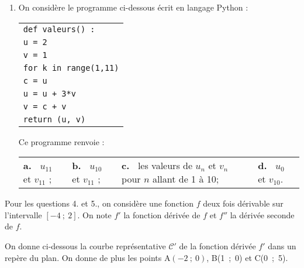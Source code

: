 \documentclass[10pt,a4paper]{article}
\begin{document}
\begin{enumerate}
\item On considère le programme ci-dessous écrit en langage Python :

\begin{center}
\begin{tabular}{|>{\texttt}l|}\hline
\texttt{def valeurs() :}\\
\quad \texttt{u = 2}\\
\quad \texttt{v = 1}\\
\quad \texttt{for k in range(1,11)}\\
\quad \quad \texttt{c = u}\\
\quad \quad \texttt{u = u + 3*v}\\
\quad \quad \texttt{v = c + v}\\
\quad \texttt{return (u, v)}\\ \hline
\end{tabular}
\end{center}

Ce programme renvoie :

\begin{center}
\begin{tabularx}{\linewidth}{*{4}{X}}
\textbf{a.~} $u_{11}$ et $v_{11}$ ;&
\textbf{b.~} $u_{10}$ et $v_{11}$ ;&
\textbf{c.~} les valeurs de $u_n$ et $v_n$ pour $n$ allant de 1 à 10;&
\textbf{d.~} $u_{0 }$ et $v_{10}$.
\end{tabularx}
\end{center}
\end{enumerate}

Pour les questions 4. et 5., on considère une fonction $f$ deux fois dérivable sur l'intervalle
$[-4~;~2]$. On note $f'$ la fonction dérivée de $f$ et $f''$  la dérivée seconde de $f$.

On donne ci-dessous la courbe représentative $\mathcal{C}'$ de la fonction dérivée $f'$ dans un repère du plan. On donne de plus les points A$(-2~;~0)$, B(1~;~0) et C(0~;~5).
\end{document}
